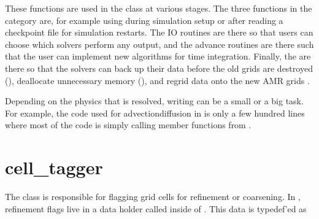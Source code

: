 \documentclass[letterpaper,10pt,english]{sphinxmanual}
\begin{document}
\begin{sphinxVerbatim}[commandchars=\\\{\},formatcom=\scriptsize]
    
         
    
            
\end{sphinxVerbatim}

These functions are used in the  class at various stages.
The three functions in the category  are, for example using during simulation setup or after reading a checkpoint file for simulation restarts.
The IO routines are there so that users can choose which solvers perform any output, and the advance routines are there such that the user can implement new algorithms for time integration.
Finally, the  are there so that the solvers can back up their data before the old grids are destroyed (), deallocate unnecessary memory (), and regrid data onto the new AMR grids .

Depending on the physics that is resolved, writing  can be a small or a big task.
For example, the code used for advection\sphinxhyphen{}diffusion in  is only a few hundred lines where most of the code is simply calling member functions from {\hyperref[\detokenize{CDR:chap-cdr}]{}}.


\section{cell\_tagger}
\label{\detokenize{CellTagger:cell-tagger}}\label{\detokenize{CellTagger:chap-cell-tagger}}\label{\detokenize{CellTagger::doc}}
The  class is responsible for flagging grid cells for refinement or coarsening.
In , refinement flags live in a data holder called  inside of .
This data is typedef’ed as
\end{document}
